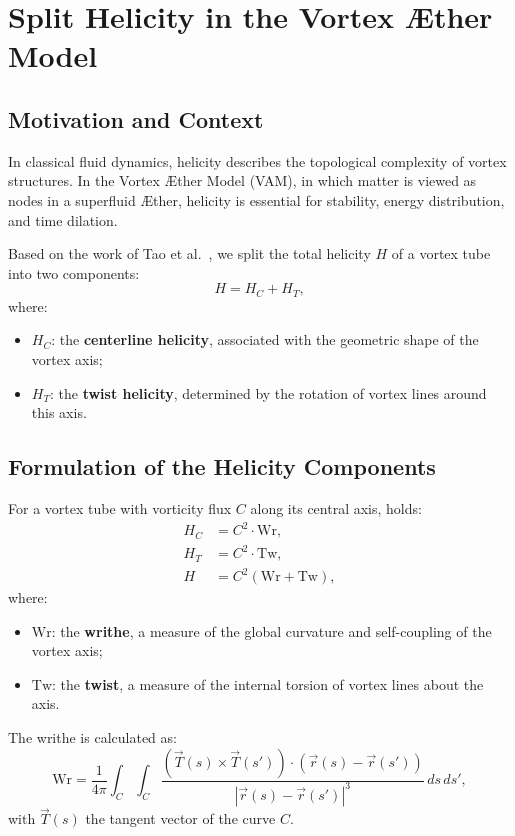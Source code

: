 \section{Split Helicity in the Vortex Æther Model}

\subsection{Motivation and Context}

In classical fluid dynamics, helicity describes the topological complexity of vortex structures. In the Vortex Æther Model (VAM), in which matter is viewed as nodes in a superfluid Æther, helicity is essential for stability, energy distribution, and time dilation.

Based on the work of Tao et al.~\cite{Tao2021}, we split the total helicity $H$ of a vortex tube into two components:
\begin{equation}
    H = H_C + H_T,
\end{equation}
where:
\begin{itemize}
    \item $H_C$: the \textbf{centerline helicity}, associated with the geometric shape of the vortex axis;
    \item $H_T$: the \textbf{twist helicity}, determined by the rotation of vortex lines around this axis.
\end{itemize}

\subsection{Formulation of the Helicity Components}

For a vortex tube with vorticity flux $C$ along its central axis, holds:
\begin{align}
    H_C &= C^2 \cdot \text{Wr}, \\
    H_T &= C^2 \cdot \text{Tw}, \\
    H &= C^2 (\text{Wr} + \text{Tw}),
\end{align}
where:
\begin{itemize}
    \item $\text{Wr}$: the \textbf{writhe}, a measure of the global curvature and self-coupling of the vortex axis;
    \item $\text{Tw}$: the \textbf{twist}, a measure of the internal torsion of vortex lines about the axis.
\end{itemize}

The writhe is calculated as:
\begin{equation}
    \text{Wr} = \frac{1}{4\pi} \int_C \int_C \frac{\left(\vec{T}(s) \times \vec{T}(s')\right) \cdot \left(\vec{r}(s) - \vec{r}(s')\right)}{|\vec{r}(s) - \vec{r}(s')|^3} \, ds \, ds',
\end{equation}
with $\vec{T}(s)$ the tangent vector of the curve $C$.

